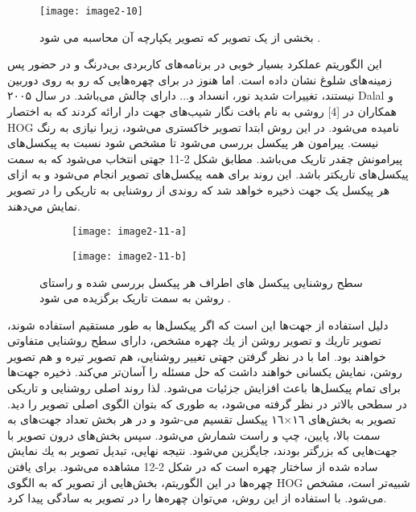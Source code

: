 \begin{figure}[h]
\centering
  \texttt{[image: image2-10]}
  \caption{بخشی از یک تصویر که تصویر یکپارچه آن محاسبه می شود \cite{ref1}.}
  \label{image2-10}
\end{figure}

این الگوریتم عملکرد بسیار خوبی در برنامه‌های کاربردی بی‌درنگ و در حضور پس زمینه‌های شلوغ نشان داده است. اما هنوز در برای چهره‌هایی که رو به روی دوربین نیستند، تغییرات شدید نور، انسداد و... دارای چالش می‌باشد.
در سال ۲۰۰۵ Dalal و همکاران در [4] روشی به نام بافت نگار شیب‌های جهت دار  ارائه کردند که به اختصار  HOG نامیده می‌شود. در این روش ابتدا تصویر خاکستری می‌شود، زیرا نیازی به رنگ نیست. پیرامون هر پیکسل بررسی می‌شود تا مشخص شود نسبت به پیکسل‌های پیرامونش چقدر تاریک می‌باشد. مطابق شکل 2-11 جهتی انتخاب می‌شود که به سمت پیکسل‌های تاریکتر باشد. این روند برای همه پیکسل‌های تصوير انجام می‌شود و به ازای هر پیکسل یک جهت ذخیره خواهد شد که روندی از روشنايى به تاريكى را در تصوير نمايش مي‌دهند.

\begin{figure}
\begin{subfigure}{.5\textwidth}
  \centering
  \texttt{[image: image2-11-a]}
  \label{image2-11-a}
\end{subfigure}
\begin{subfigure}{.5\textwidth}
  \centering
  \texttt{[image: image2-11-b]}
  \label{image2-11-b}
\end{subfigure}
 \caption{سطح روشنایی پیکسل های اطراف هر پیکسل بررسی شده و راستای روشن به سمت تاریک برگزیده می شود \cite{ref1}.}
\label{fig:image2-11}
\end{figure}

دليل استفاده از جهت‌ها این است که اگر پیکسل‌ها به طور مستقيم استفاده شوند، تصوير تاريك و تصوير روشن از يك چهره مشخص، دارای سطح روشنایی متفاوتى خواهند بود. اما با در نظر گرفتن جهتى تغییر روشنايى، هم تصوير تيره و هم تصوير روشن، نمايش يكسانى خواهند داشت كه حل مسئله را آسان‌تر مي‌كند.
ذخيره جهت‌ها براى تمام پیکسل‌ها باعث افزایش جزئيات می‌شود. لذا روند اصلى روشنايى و تاريكى در سطحی بالاتر در نظر گرفته می‌شود، به طورى كه بتوان الگوى اصلى تصوير را ديد. تصوير به بخش‌هاى ١٦×١٦ پيكسل تقسیم می-شود و در هر بخش تعداد جهت‌هاى به سمت بالا، پايين، چپ و راست شمارش مي‌شود. سپس بخش‌هاى درون تصوير با جهت‌هايى كه بزرگتر بودند، جايگزين مي‌شود. نتيجه نهايى، تبديل تصوير به يك نمايش ساده شده از ساختار چهره است که در شکل 2-12 مشاهده می‌شود. براى يافتن چهره‌ها در این الگوریتم، بخش‌هايى از تصوير كه به الگوى HOG شبيه‌تر است، مشخص می‌شود. با استفاده از اين روش، مي‌توان چهره‌ها را در تصویر به سادگى پيدا كرد.

